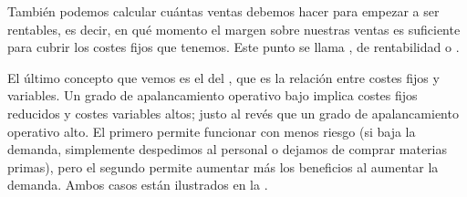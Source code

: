 \documentclass[nochap,palatino,shortheader]{apuntes}
\begin{document}
También podemos calcular cuántas ventas debemos hacer para empezar a ser rentables, es decir, en qué momento el margen sobre nuestras ventas es suficiente para cubrir los costes fijos que tenemos. Este punto se llama , de rentabilidad o .

El último concepto que vemos es el del , que es la relación entre costes fijos y variables. Un grado de apalancamiento operativo bajo implica costes fijos reducidos y costes variables altos; justo al revés que un grado de apalancamiento operativo alto. El primero permite funcionar con menos riesgo (si baja la demanda, simplemente despedimos al personal o dejamos de comprar materias primas), pero el segundo permite aumentar más los beneficios al aumentar la demanda. Ambos casos están ilustrados en la .
\end{document}
